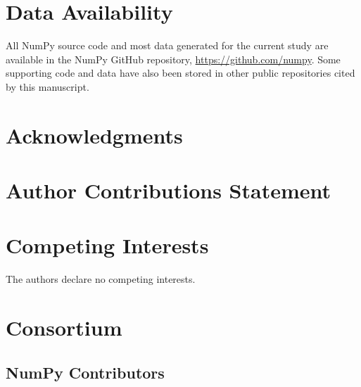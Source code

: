 \documentclass[fleqn,10pt]{wlscirep}
\begin{document}
\section*{Data Availability}

All NumPy source code and most data generated for the current study are
available in the NumPy GitHub repository, \url{https://github.com/numpy}. Some
supporting code and data have also been stored in other public repositories
cited by this manuscript.



\section*{Acknowledgments}


\section*{Author Contributions Statement}


\section*{Competing Interests}

The authors declare no competing interests.

\section*{Consortium}
\subsection*{NumPy Contributors}

\end{document}
